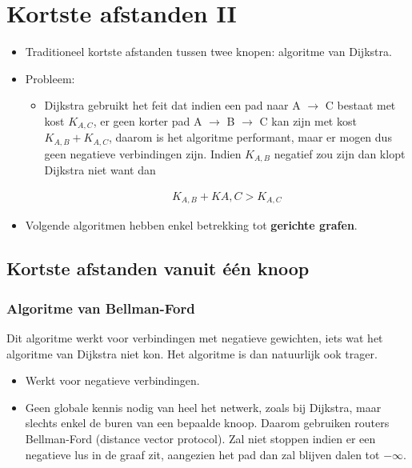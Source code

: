 \chapter{Kortste afstanden II}
\begin{itemize}
	\item Traditioneel kortste afstanden tussen twee knopen: algoritme van Dijkstra.
	\item Probleem:
	\begin{itemize}
		\item Dijkstra gebruikt het feit dat indien een pad naar A $\rightarrow$ C bestaat met kost $K_{A, C}$, er geen korter pad A $\rightarrow$ B $\rightarrow$ C kan zijn met kost $K_{A, B} + K_{A, C}$, daarom is het algoritme performant, maar er mogen dus geen negatieve verbindingen zijn. Indien $K_{A, B}$ negatief zou zijn dan klopt Dijkstra niet want dan 

		\begin{align*}
			K_{A, B} + K{A, C} > K_{A, C}
		\end{align*}
	\end{itemize}
	\item Volgende algoritmen hebben enkel betrekking tot \textbf{gerichte grafen}.

\end{itemize}
\section{Kortste afstanden vanuit één knoop}
\subsection{Algoritme van Bellman-Ford}
Dit algoritme werkt voor verbindingen met negatieve gewichten, iets wat het algoritme van Dijkstra niet kon. Het algoritme is dan natuurlijk ook trager.

\begin{itemize}
	\item  Werkt voor negatieve verbindingen.
	\item  Geen globale kennis nodig van heel het netwerk, zoals bij Dijkstra, maar slechts enkel de buren van een bepaalde knoop. Daarom gebruiken routers Bellman-Ford (distance vector protocol).
	\alert  Zal niet stoppen indien er een negatieve lus in de graaf zit, aangezien het pad dan zal blijven dalen tot $-\infty$. 
\end{itemize}

